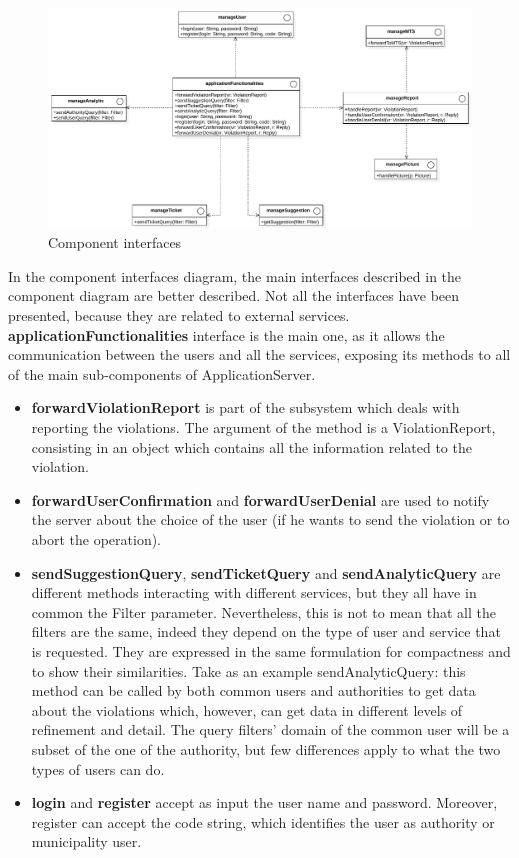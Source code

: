 \documentclass[./main.tex]{subfiles}
\begin{document}
\begin{figure}[H]
\centering
\includegraphics[width=\textwidth]{resources/interfaces_diagram}
\caption{Component interfaces}
\label{fig:interfaces}
\end{figure}

In the component interfaces diagram, the main interfaces described in the component diagram are better described. Not all the interfaces have been presented, because they are related to external services.\medskip\\
\textbf{applicationFunctionalities} interface is the main one, as it allows the communication between the users and all the services, exposing its methods to all of the main sub-components of ApplicationServer.
 
\begin{itemize}
\item
	\textbf{forwardViolationReport} is part of the subsystem which deals with reporting the violations. The argument of the method is a ViolationReport, consisting in an object which contains all the information related to the violation.

\item
	\textbf{forwardUserConfirmation} and \textbf{forwardUserDenial} are used to notify the server about the choice of the user (if he wants to send the violation or to abort the operation).

\item
	\textbf{sendSuggestionQuery}, \textbf{sendTicketQuery} and \textbf{sendAnalyticQuery} are different methods interacting with different services, but they all have in common the Filter parameter. Nevertheless, this is not to mean that all the filters are the same, indeed they depend on the type of user and service that is requested. They are expressed in the same formulation for compactness and to show their similarities. Take as an example sendAnalyticQuery: this method can be called by both common users and authorities to get data about the violations which, however, can get data in different levels of refinement and detail. The query filters' domain of the common user will be a subset of the one of the authority, but few differences apply to what the two types of users can do.
	
\item
	\textbf{login} and \textbf{register} accept as input the user name and password. Moreover, register can accept the code string, which identifies the user as authority or municipality user.
	
\end{itemize}
\end{document}
